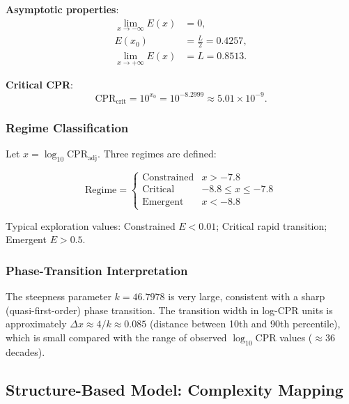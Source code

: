 \documentclass[12pt,a4paper]{article}
\begin{document}
\noindent\textbf{Asymptotic properties}:
\begin{align}
    \lim_{x\to-\infty} E(x) &= 0, \label{eq:asym_left}\\
    E(x_{0}) &= \tfrac{L}{2} = 0.4257, \label{eq:midpoint}\\
    \lim_{x\to+\infty} E(x) &= L = 0.8513. \label{eq:asym_right}
\end{align}

\noindent\textbf{Critical CPR}:
\begin{equation}\label{eq:cpr_crit}
    \mathrm{CPR}_{\text{crit}} = 10^{x_{0}} = 10^{-8.2999} \approx 5.01\times10^{-9}.
\end{equation}

\subsubsection{Regime Classification}

Let $x = \log_{10}\mathrm{CPR}_{\text{adj}}$. Three regimes are defined:

\begin{equation}\label{eq:regimes}
\text{Regime} = \begin{cases}
    \text{Constrained} & x > -7.8 \\
    \text{Critical}    & -8.8 \leq x \leq -7.8 \\
    \text{Emergent}    & x < -8.8
\end{cases}
\end{equation}

Typical exploration values: Constrained $E < 0.01$; Critical rapid transition; Emergent $E > 0.5$.

\subsubsection{Phase-Transition Interpretation}

The steepness parameter $k = 46.7978$ is very large, consistent with a sharp (quasi-first-order) phase transition. The transition width in log-CPR units is approximately $\Delta x \approx 4/k \approx 0.085$ (distance between 10th and 90th percentile), which is small compared with the range of observed $\log_{10}\mathrm{CPR}$ values ($\approx 36$ decades).

\subsection{Structure-Based Model: Complexity Mapping}\label{sec:complexity}
\end{document}

